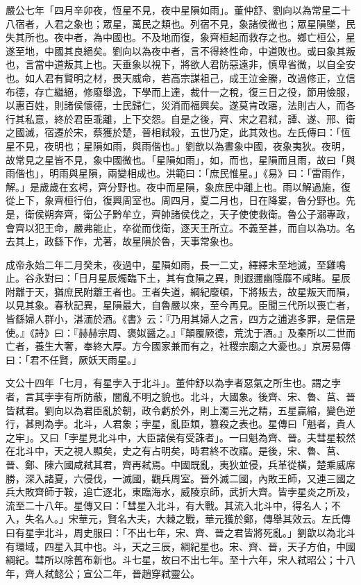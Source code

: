 \begin{pinyinscope}
嚴公七年「四月辛卯夜，恆星不見，夜中星隕如雨」。董仲舒、劉向以為常星二十八宿者，人君之象也；眾星，萬民之類也。列宿不見，象諸侯微也；眾星隕墜，民失其所也。夜中者，為中國也。不及地而復，象齊桓起而救存之也。鄉亡桓公，星遂至地，中國其良絕矣。劉向以為夜中者，言不得終性命，中道敗也。或曰象其叛也，言當中道叛其上也。天垂象以視下，將欲人君防惡遠非，慎卑省微，以自全安也。如人君有賢明之材，畏天威命，若高宗謀祖己，成王泣金縢，改過修正，立信布德，存亡繼絕，修廢舉逸，下學而上達，裁什一之稅，復三日之役，節用儉服，以惠百姓，則諸侯懷德，士民歸仁，災消而福興矣。遂莫肯改寤，法則古人，而各行其私意，終於君臣乖離，上下交怨。自是之後，齊、宋之君弒，譚、遂、邢、衛之國滅，宿遷於宋，蔡獲於楚，晉相弒殺，五世乃定，此其效也。左氏傳曰：「恆星不見，夜明也；星隕如雨，與雨偕也。」劉歆以為晝象中國，夜象夷狄。夜明，故常見之星皆不見，象中國微也。「星隕如雨」，如，而也，星隕而且雨，故曰「與雨偕也」，明雨與星隕，兩變相成也。洪範曰：「庶民惟星。」《易》曰：「雷雨作，解。」是歲歲在玄枵，齊分野也。夜中而星隕，象庶民中離上也。雨以解過施，復從上下，象齊桓行伯，復興周室也。周四月，夏二月也，日在降婁，魯分野也。先是，衛侯朔奔齊，衛公子黔牟立，齊帥諸侯伐之，天子使使救衛。魯公子溺專政，會齊以犯王命，嚴弗能止，卒從而伐衛，逐天王所立。不義至甚，而自以為功。名去其上，政繇下作，尤著，故星隕於魯，天事常象也。

成帝永始二年二月癸未，夜過中，星隕如雨，長一二丈，繹繹未至地滅，至雞鳴止。谷永對曰：「日月星辰燭臨下土，其有食隕之異，則遐邇幽隱靡不咸睹。星辰附離于天，猶庶民附離王者也。王者失道，綱紀廢頓，下將叛去，故星叛天而隕，以見其象。春秋記異，星隕最大，自魯嚴以來，至今再見。臣聞三代所以喪亡者，皆繇婦人群小，湛湎於酒。《書》云：『乃用其婦人之言，四方之逋逃多罪，是信是使。』《詩》曰：『赫赫宗周、褒姒醤之。』『顛覆厥德，荒沈于酒。』及秦所以二世而亡者，養生大奢，奉終大厚。方今國家兼而有之，社稷宗廟之大憂也。」京房易傳曰：「君不任賢，厥妖天雨星。」

文公十四年「七月，有星孛入于北斗」。董仲舒以為孛者惡氣之所生也。謂之孛者，言其孛孛有所防蔽，闇亂不明之貌也。北斗，大國象。後齊、宋、魯、莒、晉皆弒君。劉向以為君臣亂於朝，政令虧於外，則上濁三光之精，五星贏縮，變色逆行，甚則為孛。北斗，人君象；孛星，亂臣類，篡殺之表也。星傳曰「魁者，貴人之牢」。又曰「孛星見北斗中，大臣諸侯有受誅者」。一曰魁為齊、晉。夫彗星較然在北斗中，天之視人顯矣，史之有占明矣，時君終不改寤。是後，宋、魯、莒、晉、鄭、陳六國咸弒其君，齊再弒焉。中國既亂，夷狄並侵，兵革從橫，楚乘威席勝，深入諸夏，六侵伐，一滅國，觀兵周室。晉外滅二國，內敗王師，又連三國之兵大敗齊師于鞍，追亡逐北，東臨海水，威陵京師，武折大齊。皆孛星炎之所及，流至二十八年。星傳又曰：「彗星入北斗，有大戰。其流入北斗中，得名人；不入，失名人。」宋華元，賢名大夫，大棘之戰，華元獲於鄭，傳舉其效云。左氏傳曰有星孛北斗，周史服曰：「不出七年，宋、齊、晉之君皆將死亂。」劉歆以為北斗有環域，四星入其中也。斗，天之三辰，綱紀星也。宋、齊、晉，天子方伯，中國綱紀。彗所以除舊布新也。斗七星，故曰不出七年。至十六年，宋人弒昭公；十八年，齊人弒懿公；宣公二年，晉趙穿弒靈公。


\end{pinyinscope}
